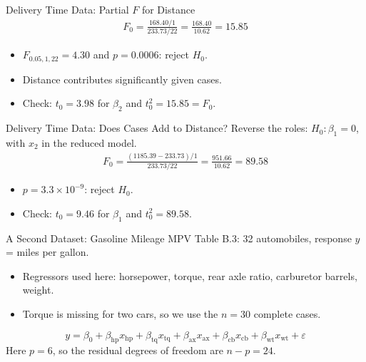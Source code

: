 \begin{frame}{Delivery Time Data: Partial $F$ for Distance}
    \begin{align*}
        F_0 = \frac{168.40/1}{233.73/22} = \frac{168.40}{10.62} = 15.85
    \end{align*}
    \begin{itemize}
        \item $F_{0.05,1,22}=4.30$ and $p=0.0006$: reject $H_0$.
        \item Distance contributes significantly given cases.
        \item Check: $t_0=3.98$ for $\beta_2$ and $t_0^2=15.85=F_0$.
    \end{itemize}
\end{frame}


\begin{frame}{Delivery Time Data: Does Cases Add to Distance?}
    Reverse the roles: $H_0:\beta_1=0$, with $x_2$ in the reduced model.
    \begin{align*}
        F_0 = \frac{(1185.39-233.73)/1}{233.73/22} = \frac{951.66}{10.62} = 89.58
    \end{align*}
    \begin{itemize}
        \item $p=3.3\times10^{-9}$: reject $H_0$.
        \item Check: $t_0=9.46$ for $\beta_1$ and $t_0^2=89.58$.
    \end{itemize}
\end{frame}


\begin{frame}{A Second Dataset: Gasoline Mileage}
    MPV Table B.3: 32 automobiles, response $y$ = miles per gallon.
    \svspace{0.5em}
    \begin{itemize}
        \item Regressors used here: horsepower, torque, rear axle ratio, carburetor barrels, weight.
        \item Torque is missing for two cars, so we use the $n=30$ complete cases.
    \end{itemize}
    \[
    y = \beta_0 + \beta_{\mathrm{hp}}x_{\mathrm{hp}} + \beta_{\mathrm{tq}}x_{\mathrm{tq}} + \beta_{\mathrm{ax}}x_{\mathrm{ax}} + \beta_{\mathrm{cb}}x_{\mathrm{cb}} + \beta_{\mathrm{wt}}x_{\mathrm{wt}} + \varepsilon
    \]
    Here $p=6$, so the residual degrees of freedom are $n-p=24$.
\end{frame}


